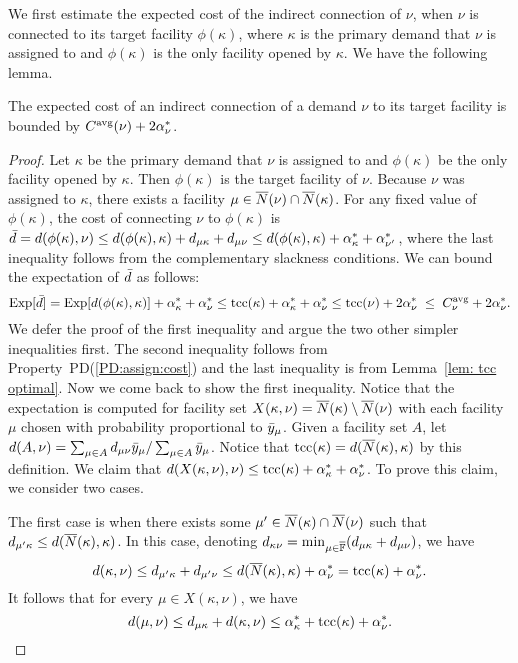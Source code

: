 \documentclass[11pt]{article}
\begin{document}
We first estimate the expected cost of the indirect
connection of $\nu$, when $\nu$ is connected to its target
facility $\phi(\kappa)$, where $\kappa$ is the primary
demand that $\nu$ is assigned to and $\phi(\kappa)$ is the
only facility opened by $\kappa$. We have the following
lemma.
\begin{lemma}
  \label{lem:echu indirect}
  The expected cost of an indirect connection of a demand
  $\nu$ to its target facility is bounded by
  $C^{{\mbox{\scriptsize\rm avg}}}(\nu)+2\alpha_{\nu}^\ast$.
\end{lemma}
\begin{proof}
  Let $\kappa$ be the primary demand that $\nu$ is assigned
  to and $\phi(\kappa)$ be the only facility opened by
  $\kappa$. Then $\phi(\kappa)$ is the target facility of
  $\nu$. Because $\nu$ was assigned to $\kappa$, there
  exists a facility $\mu\in {\overline{N}}(\nu)\cap {\overline{N}}(\kappa)$.
  For any fixed value of $\phi(\kappa)$, the cost of
  connecting $\nu$ to $\phi(\kappa)$ is ${\bar d} =
  d(\phi(\kappa),\nu) \le d(\phi(\kappa),\kappa)+
  d_{\mu\kappa}+d_{\mu\nu} \le
  d(\phi(\kappa),\kappa)+\alpha_{\kappa}^\ast +
  \alpha_{\nu'}^\ast$, where the last inequality follows
  from the complementary slackness conditions. We can bound
  the expectation of ${\bar d}$ as follows:
%
\begin{equation}
	\label{eqn: 1.76 connection cost}
  \mbox{\rm Exp}[{\bar d}] = \mbox{\rm Exp}[d(\phi(\kappa), \kappa)]  + \alpha_{\kappa}^\ast + \alpha_{\nu}^\ast
  \leq \textrm{tcc}(\kappa) + \alpha_{\kappa}^\ast + \alpha_{\nu}^\ast
  \leq \textrm{tcc}(\nu) + 2\alpha_{\nu}^\ast\;\leq\; C^{{\mbox{\scriptsize\rm avg}}}_{\nu} + 2\alpha_{\nu}^\ast.
\end{equation}
%
We defer the proof of the first inequality and argue the two
other simpler inequalities first. The second inequality
follows from Property~PD(\ref{PD:assign:cost}) and the last
inequality is from Lemma~\ref{lem: tcc optimal}. Now we come
back to show the first inequality. Notice that the
expectation is computed for facility set
$X(\kappa,\nu)={\overline{N}}(\kappa) \setminus {\overline{N}}(\nu)$ with
each facility $\mu$ chosen with probability proportional to
${\bar y}_{\mu}$. Given a facility set $A$, let
$d(A,\nu)=\sum_{\mu\in A} d_{\mu\nu}{\bar y}_{\mu}/\sum_{\mu\in
  A} {\bar y}_{\mu}$. Notice that
$\textrm{tcc}(\kappa)=d({\overline{N}}(\kappa),\kappa)$ by this
definition. We claim that $d(X(\kappa,\nu),\nu) \leq
\textrm{tcc}(\kappa) + \alpha_{\kappa}^\ast + \alpha_{\nu}^\ast$. To
prove this claim, we consider two cases.

 The first case is when there exists some $\mu'\in
{\overline{N}}(\kappa) \cap {\overline{N}}(\nu)$ such that $d_{\mu' \kappa}
\leq d({\overline{N}}(\kappa), \kappa)$. In this case, denoting
$d_{\kappa \nu}=\min_{\mu\in\overline{\mathbb{F}}} (d_{\mu\kappa} +
d_{\mu\nu})$, we have
\begin{equation*}
  d(\kappa,\nu)\leq
  d_{\mu'\kappa} + d_{\mu'\nu} \leq d({\overline{N}}(\kappa),\kappa) +
  \alpha_{\nu}^\ast=\textrm{tcc}(\kappa)+\alpha_{\nu}^\ast. 
\end{equation*}
It follows that for every $\mu\in X(\kappa,\nu)$, we have
\begin{equation*}
  d(\mu,\nu) \leq d_{\mu\kappa} + d(\kappa,\nu) \leq
  \alpha_{\kappa}^\ast + \textrm{tcc}(\kappa) + \alpha_{\nu}^\ast.
\end{equation*}


\end{proof}
\end{document}
